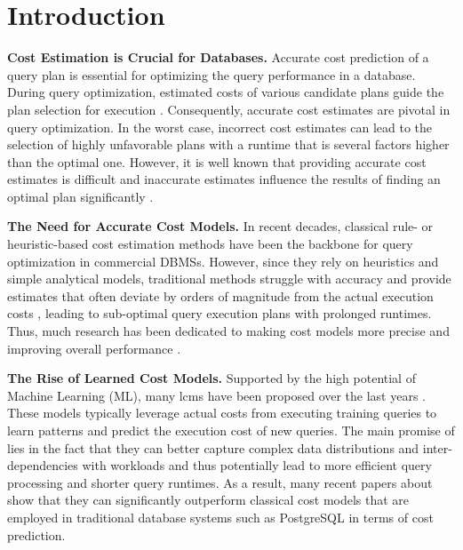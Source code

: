 \section{Introduction} \label{sec:introduction}
\noindent\textbf{Cost Estimation is Crucial for Databases.}
Accurate cost prediction of a query plan is essential for optimizing the query performance in a database.
During query optimization, estimated costs of various candidate plans guide the plan selection for execution \cite{leis_how_2015}.
Consequently, accurate cost estimates are pivotal in query optimization.
In the worst case, incorrect cost estimates can lead to the selection of highly unfavorable plans with a runtime that is several factors higher than the optimal one.
However, it is well known that providing accurate cost estimates is difficult and inaccurate estimates influence the results of finding an optimal plan significantly \cite{lan2021survey, heinrich2024}.

\noindent\textbf{The Need for Accurate Cost Models.}
In recent decades, classical rule- or heuristic-based cost estimation methods have been the backbone for query optimization in commercial DBMSs.
However, since they rely on heuristics and simple analytical models, traditional methods struggle with accuracy and provide estimates that often deviate by orders of magnitude from the actual execution costs \cite{leis_how_2015}, leading to sub-optimal query execution plans with prolonged runtimes.
Thus, much research has been dedicated to making cost models more precise and improving overall performance \cite{karampaglis2014, he2005}.

\noindent\textbf{The Rise of Learned Cost Models.} 
Supported by the high potential of Machine Learning (ML), many \acfp{lcm} have been proposed over the last years \cite{hilprecht2022, ganapathi2009, akdere2012, kipf2019, marcus2019, zibo_liang_dace_2024, yang2023, zhao2022, li_learned_2024, chang2024, lu2022, duggan2011, heinrich2024, zhou2020, wu2022, agnihotri2024}.
These models typically leverage actual costs from executing training queries to learn patterns and predict the execution cost of new queries.
The main promise of \lcms lies in the fact that they can better capture complex data distributions and inter-dependencies with workloads and thus potentially lead to more efficient query processing and shorter query runtimes.
As a result, many recent papers about \lcms \cite{zibo_liang_dace_2024, sun2019, hilprecht2022} show that they can significantly outperform classical cost models that are employed in traditional database systems such as PostgreSQL in terms of cost prediction.

